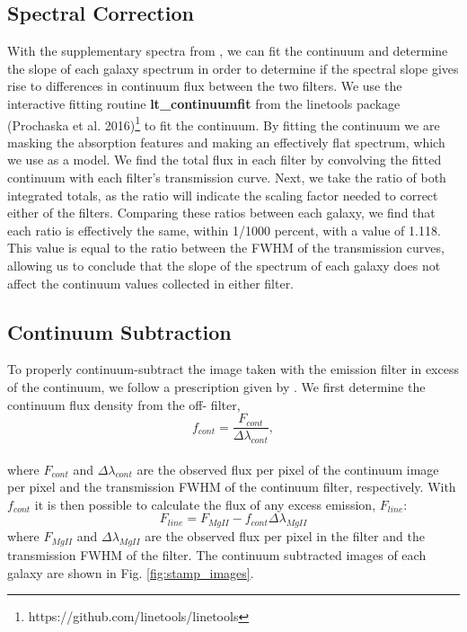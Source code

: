 \documentclass[twocolumn]{aastex6}
\begin{document}
\subsection{Spectral Correction}
With the supplementary spectra from \cite{Rubin_2014}, we can fit the continuum and determine the slope of each galaxy spectrum in order to determine if the spectral slope gives rise to differences in continuum flux between the two filters. We use the interactive fitting routine \textbf{lt\_continuumfit} from the linetools package (Prochaska et al. 2016)\footnote{https://github.com/linetools/linetools} to fit the continuum. By fitting the continuum we are masking the absorption features and making an effectively flat spectrum, which we use as a model. We find the total flux in each filter by convolving the fitted continuum with each filter's transmission curve. Next, we take the ratio of both integrated totals, as the ratio will indicate the scaling factor needed to correct either of the filters. Comparing these ratios between each galaxy, we find that each ratio is effectively the same, within 1/1000 percent, with a value of 1.118. This value is equal to the ratio between the FWHM of the transmission curves, allowing us to conclude that the slope of the spectrum of each galaxy does not affect the continuum values collected in either filter.

\subsection{Continuum Subtraction}
To properly continuum-subtract the image taken with the emission filter in excess of the continuum, we follow a prescription given by \cite{Battaia_2015}. 
We first determine the continuum flux density from the off- filter,
\begin{equation}
f_{cont}=\frac{F_{cont}}{\Delta \lambda_{cont}},
\end{equation}\\
where $F_{cont}$ and $\Delta \lambda_{cont}$ are the observed flux per pixel of the continuum image per pixel and the transmission FWHM of the continuum filter, respectively. With $f_{cont}$ it is then possible to calculate the flux of any excess emission, $F_{line}$:
\begin{equation}
F_{line}=F_{MgII}-f_{cont} \Delta \lambda_{MgII}
\label{eq:subtraction}
\end{equation}
where $F_{MgII}$ and $\Delta \lambda_{MgII}$ are the observed flux per pixel in the  filter and the transmission FWHM of the  filter. The continuum subtracted images of each galaxy are shown in Fig. \ref{fig:stamp_images}.
\end{document}
